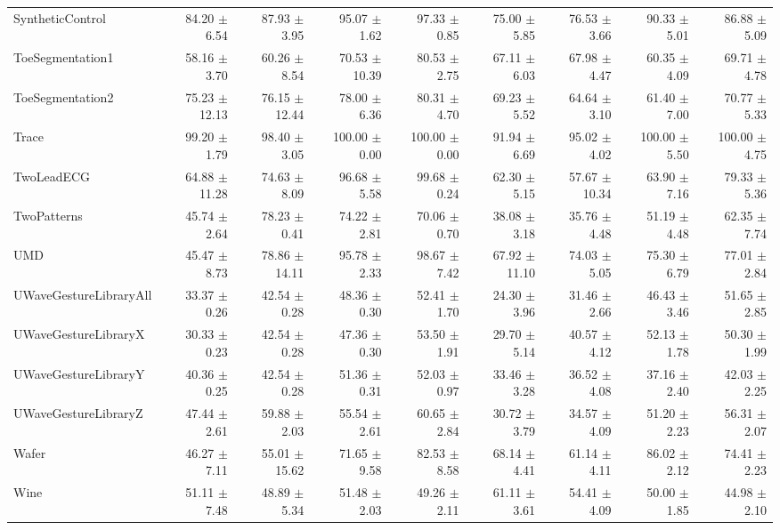 \begin{landscape}
\begin{longtable}{lrrrrrrrr}
SyntheticControl & 84.20 $\pm$ 6.54 & 87.93 $\pm$ 3.95 & 95.07 $\pm$ 1.62 & 97.33 $\pm$ 0.85 & 75.00 $\pm$ 5.85 & 76.53 $\pm$ 3.66 & 90.33 $\pm$ 5.01 & 86.88 $\pm$ 5.09 \\
ToeSegmentation1 & 58.16 $\pm$ 3.70 & 60.26 $\pm$ 8.54 & 70.53 $\pm$ 10.39 & 80.53 $\pm$ 2.75 & 67.11 $\pm$ 6.03 & 67.98 $\pm$ 4.47 & 60.35 $\pm$ 4.09 & 69.71 $\pm$ 4.78 \\
ToeSegmentation2 & 75.23 $\pm$ 12.13 & 76.15 $\pm$ 12.44 & 78.00 $\pm$ 6.36 & 80.31 $\pm$ 4.70 & 69.23 $\pm$ 5.52 & 64.64 $\pm$ 3.10 & 61.40 $\pm$ 7.00 & 70.77 $\pm$ 5.33 \\
Trace & 99.20 $\pm$ 1.79 & 98.40 $\pm$ 3.05 & 100.00 $\pm$ 0.00 & 100.00 $\pm$ 0.00 & 91.94 $\pm$ 6.69 & 95.02 $\pm$ 4.02 & 100.00 $\pm$ 5.50 & 100.00 $\pm$ 4.75 \\
TwoLeadECG & 64.88 $\pm$ 11.28 & 74.63 $\pm$ 8.09 & 96.68 $\pm$ 5.58 & 99.68 $\pm$ 0.24 & 62.30 $\pm$ 5.15 & 57.67 $\pm$ 10.34 & 63.90 $\pm$ 7.16 & 79.33 $\pm$ 5.36 \\
TwoPatterns & 45.74 $\pm$ 2.64 & 78.23 $\pm$ 0.41 & 74.22 $\pm$ 2.81 & 70.06 $\pm$ 0.70 & 38.08 $\pm$ 3.18 & 35.76 $\pm$ 4.48 & 51.19 $\pm$ 4.48 & 62.35 $\pm$ 7.74 \\
UMD & 45.47 $\pm$ 8.73 & 78.86 $\pm$ 14.11 & 95.78 $\pm$ 2.33 & 98.67 $\pm$ 7.42 & 67.92 $\pm$ 11.10 & 74.03 $\pm$ 5.05 & 75.30 $\pm$ 6.79 & 77.01 $\pm$ 2.84 \\
UWaveGestureLibraryAll & 33.37 $\pm$ 0.26 & 42.54 $\pm$ 0.28 & 48.36 $\pm$ 0.30 & 52.41 $\pm$ 1.70 & 24.30 $\pm$ 3.96 & 31.46 $\pm$ 2.66 & 46.43 $\pm$ 3.46 & 51.65 $\pm$ 2.85 \\
UWaveGestureLibraryX & 30.33 $\pm$ 0.23 & 42.54 $\pm$ 0.28 & 47.36 $\pm$ 0.30 & 53.50 $\pm$ 1.91 & 29.70 $\pm$ 5.14 & 40.57 $\pm$ 4.12 & 52.13 $\pm$ 1.78 & 50.30 $\pm$ 1.99 \\
UWaveGestureLibraryY & 40.36 $\pm$ 0.25 & 42.54 $\pm$ 0.28 & 51.36 $\pm$ 0.31 & 52.03 $\pm$ 0.97 & 33.46 $\pm$ 3.28 & 36.52 $\pm$ 4.08 & 37.16 $\pm$ 2.40 & 42.03 $\pm$ 2.25 \\
UWaveGestureLibraryZ & 47.44 $\pm$ 2.61 & 59.88 $\pm$ 2.03 & 55.54 $\pm$ 2.61 & 60.65 $\pm$ 2.84 & 30.72 $\pm$ 3.79 & 34.57 $\pm$ 4.09 & 51.20 $\pm$ 2.23 & 56.31 $\pm$ 2.07 \\
Wafer & 46.27 $\pm$ 7.11 & 55.01 $\pm$ 15.62 & 71.65 $\pm$ 9.58 & 82.53 $\pm$ 8.58 & 68.14 $\pm$ 4.41 & 61.14 $\pm$ 4.11 & 86.02 $\pm$ 2.12 & 74.41 $\pm$ 2.23 \\
Wine & 51.11 $\pm$ 7.48 & 48.89 $\pm$ 5.34 & 51.48 $\pm$ 2.03 & 49.26 $\pm$ 2.11 & 61.11 $\pm$ 3.61 & 54.41 $\pm$ 4.09 & 50.00 $\pm$ 1.85 & 44.98 $\pm$ 2.10 \\

\end{longtable}
\end{landscape}

